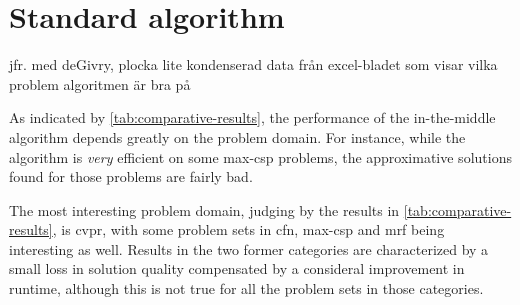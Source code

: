 \section{Standard algorithm}
jfr. med deGivry, plocka lite kondenserad data från excel-bladet som visar vilka problem algoritmen är bra på


%	
%
%	


As indicated by \cref{tab:comparative-results}, the performance of the in-the-middle algorithm depends greatly on the problem domain.
For instance, while the algorithm is \emph{very} efficient on some max-\gls{csp} problems, the approximative solutions found for those problems are fairly bad.

The most interesting problem domain, judging by the results in \cref{tab:comparative-results}, is \gls{cvpr}, with some problem sets in \gls{cfn}, max-\gls{csp} and \gls{mrf} being interesting as well.
Results in the two former categories are characterized by a small loss in solution quality compensated by a consideral improvement in runtime, although this is not true for all the problem sets in those categories.

